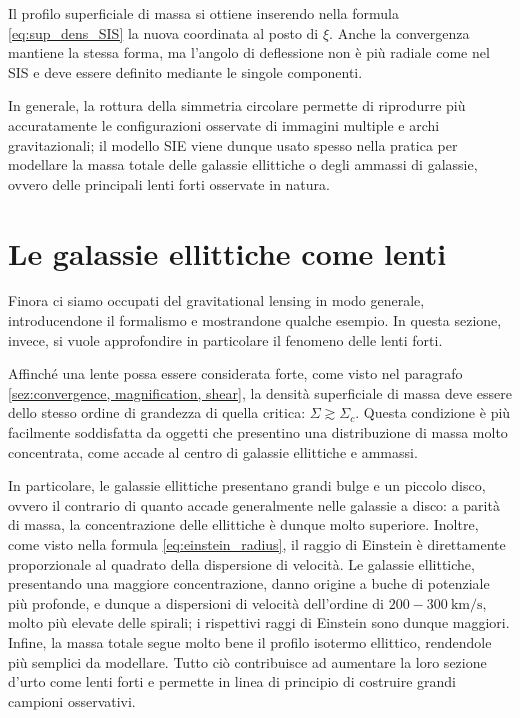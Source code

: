 Il profilo superficiale di massa si ottiene inserendo nella formula \ref{eq:sup_dens_SIS} la nuova coordinata al posto di $\xi$. Anche la convergenza mantiene la stessa forma, ma l'angolo di deflessione non è più radiale come nel SIS e deve essere definito mediante le singole componenti. 

In generale, la rottura della simmetria circolare permette di riprodurre più accuratamente le configurazioni osservate di immagini multiple e archi gravitazionali; il modello SIE viene dunque usato spesso nella pratica per modellare la massa totale delle galassie ellittiche o degli ammassi di galassie, ovvero delle principali lenti forti osservate in natura.

\section{Le galassie ellittiche come lenti}
\label{sez:ETGs_as_lenses}
Finora ci siamo occupati del gravitational lensing in modo generale, introducendone il formalismo e mostrandone qualche esempio. In questa sezione, invece, si vuole approfondire in particolare il fenomeno delle lenti forti.

Affinché una lente possa essere considerata forte, come visto nel paragrafo \ref{sez:convergence, magnification, shear}, la densità superficiale di massa deve essere dello stesso ordine di grandezza di quella critica: $\Sigma \gtrsim\Sigma_c$. Questa condizione è più facilmente soddisfatta da oggetti che presentino una distribuzione di massa molto concentrata, come accade al centro di galassie ellittiche e ammassi. 

In particolare, le galassie ellittiche presentano grandi bulge e un piccolo disco, ovvero il contrario di quanto accade generalmente nelle galassie a disco: a parità di massa, la concentrazione delle ellittiche è dunque molto superiore.
Inoltre, come visto nella formula \ref{eq:einstein_radius}, il raggio di Einstein è direttamente proporzionale al quadrato della dispersione di velocità. Le galassie ellittiche, presentando una maggiore concentrazione, danno origine a buche di potenziale più profonde, e dunque a dispersioni di velocità dell'ordine di $200-300\ \text{km/s}$, molto più elevate delle spirali; i rispettivi raggi di Einstein sono dunque maggiori. Infine, la massa totale segue molto bene il profilo isotermo ellittico, rendendole più semplici da modellare. Tutto ciò contribuisce ad aumentare la loro sezione d'urto come lenti forti e permette in linea di principio di costruire grandi campioni osservativi.


